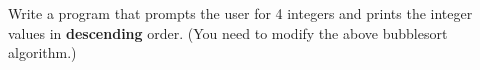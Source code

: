 Write a program that prompts the user for 4 integers and prints the integer values in \textbf{descending} order. (You need to modify the above bubblesort algorithm.)

